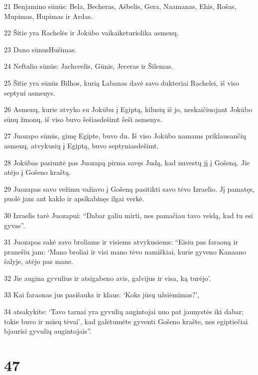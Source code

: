 \par 21 Benjamino sūnūs: Bela, Becheras, Ašbelis, Gera, Naamanas, Ehis, Rošas, Mupimas, Hupimas ir Ardas. 
\par 22 Šitie yra Rachelės ir Jokūbo vaikai­keturiolika asmenų. 
\par 23 Dano sūnus­Hušimas. 
\par 24 Neftalio sūnūs: Jachceelis, Gūnis, Jeceras ir Šilemas. 
\par 25 Šitie yra sūnūs Bilhos, kurią Labanas davė savo dukteriai Rachelei, iš viso septyni asmenys. 
\par 26 Asmenų, kurie atvyko su Jokūbu į Egiptą, kilusių iš jo, neskaičiuojant Jokūbo sūnų žmonų, iš viso buvo šešiasdešimt šeši asmenys. 
\par 27 Juozapo sūnūs, gimę Egipte, buvo du. Iš viso Jokūbo namams priklausančių asmenų, atvykusių į Egiptą, buvo septyniasdešimt. 
\par 28 Jokūbas pasiuntė pas Juozapą pirma savęs Judą, kad nuvestų jį į Gošeną. Jie atėjo į Gošeno kraštą. 
\par 29 Juozapas savo vežimu važiavo į Gošeną pasitikti savo tėvo Izraelio. Jį pamatęs, puolė jam ant kaklo ir apsikabinęs ilgai verkė. 
\par 30 Izraelis tarė Juozapui: “Dabar galiu mirti, nes pamačiau tavo veidą, kad tu esi gyvas”. 
\par 31 Juozapas sakė savo broliams ir visiems atvykusiems: “Eisiu pas faraoną ir pranešiu jam: ‘Mano broliai ir visi mano tėvo namiškiai, kurie gyveno Kanaano šalyje, atėjo pas mane. 
\par 32 Jie augina gyvulius ir atsigabeno avis, galvijus ir visa, ką turėjo’. 
\par 33 Kai faraonas jus pasišauks ir klaus: ‘Koks jūsų užsiėmimas?’, 
\par 34 atsakykite: ‘Tavo tarnai yra gyvulių augintojai nuo pat jaunystės iki dabar; tokie buvo ir mūsų tėvai’, kad galėtumėte gyventi Gošeno krašte, nes egiptiečiai bjaurisi gyvulių augintojais”.



\chapter{47}


